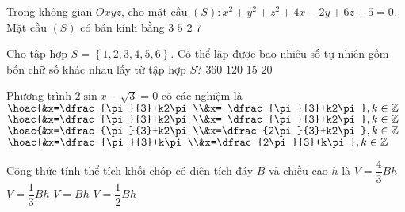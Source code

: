 \begin{ex}%
	Trong không gian  $Oxyz$, cho mặt cầu ${(S) \colon x^2+y^2+z^2 +4x-2y+6z+5=0}$. Mặt cầu $(S)$ có bán kính bằng
	\choice 
	{\True $3$}
	{$5$}
	{$2$}
	{$7$}
\end{ex}


\begin{ex}%
	Cho tập hợp $S=\left \{1,2,3,4,5,6\right \}$. Có thể lập được bao nhiêu số tự nhiên gồm bốn chữ số khác nhau lấy từ tập hợp $S$?
	\choice 
	{\True $360$}
	{$120$}
	{$15$}
	{$20$}
\end{ex}


\begin{ex}%
	Phương trình $2\sin x -\sqrt{3} =0$ có các nghiệm là
	\choice 
	{$\hoac{&x=\dfrac{\pi}{3}+k2\pi\\&x=-\dfrac{\pi}{3}+k2\pi}, k\in \mathbb{Z}$}
	{$\hoac{&x=\dfrac{\pi}{3}+k2\pi\\&x=-\dfrac{\pi}{3}+k2\pi},k\in \mathbb{Z}$}
	{\True $\hoac{&x=\dfrac{\pi}{3}+k2\pi\\&x=\dfrac{2\pi}{3}+k2\pi}, k\in \mathbb{Z}$}
	{$\hoac{&x=\dfrac{\pi}{3}+k\pi\\&x=\dfrac{2\pi}{3}+k\pi}, k\in \mathbb{Z}$}
\end{ex}


\begin{ex}%
	Công thức tính thể tích khối chóp có diện tích đáy $B$ và chiều cao $h$ là
	\choice 
	{$V=\dfrac{4}{3}Bh$}
	{\True $V=\dfrac{1}{3}Bh$}
	{$V=Bh$}
	{$V=\dfrac{1}{2}Bh$}
\end{ex}


